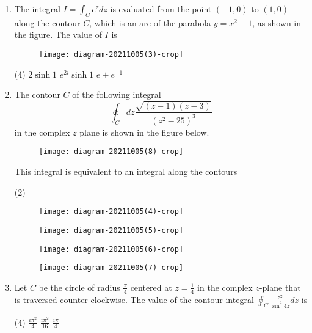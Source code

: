 \begin{enumerate}[label=\color{ocre}\textbf{\arabic*.}]
	\item The integral $I=\int_{C} e^{z} d z$ is evaluated from the point $(-1,0)$ to $(1,0)$ along the contour $C$, which is an arc of the parabola $y=x^{2}-1$, as shown in the figure. The value of $I$ is
	{}
	\begin{figure}[H]
		\centering
		\texttt{[image: diagram-20211005(3)-crop]}
	\end{figure}
	\begin{tasks}(4)
		\task[\textbf{B.}] $2 \sinh 1$
		\task[\textbf{C.}]  $e^{2 i} \sinh 1$
		\task[\textbf{D.}] $e+e^{-1}$
	\end{tasks}

	\item The contour $C$ of the following integral
	$$
	\oint_{C} d z \frac{\sqrt{(z-1)(z-3)}}{\left(z^{2}-25\right)^{3}}
	$$
	in the complex $z$ plane is shown in the figure below.\\
	\begin{figure}[H]
		\centering
		\texttt{[image: diagram-20211005(8)-crop]}
	\end{figure}
	This integral is equivalent to an integral along the contours
	{}
	\begin{tasks}(2)
		\task[\textbf{A.}] \begin{figure}[H]
			\centering
			\texttt{[image: diagram-20211005(4)-crop]}
		\end{figure}
		\task[\textbf{B.}] \begin{figure}[H]
			\centering
			\texttt{[image: diagram-20211005(5)-crop]}
		\end{figure}
		\task[\textbf{C.}] \begin{figure}[H]
			\centering
			\texttt{[image: diagram-20211005(6)-crop]}
		\end{figure}
		\task[\textbf{D.}] \begin{figure}[H]
			\centering
			\texttt{[image: diagram-20211005(7)-crop]}
		\end{figure}
	\end{tasks}

	\item  Let $C$ be the circle of radius $\frac{\pi}{4}$ centered at $z=\frac{1}{4}$ in the complex $z$-plane that is traversed counter-clockwise. The value of the contour integral $\oint_{C} \frac{z^{2}}{\sin ^{2} 4 z} d z$ is
	{}
	\begin{tasks}(4)
		\task[\textbf{B.}] $\frac{i \pi^{2}}{4}$
		\task[\textbf{C.}] $\frac{i \pi^{2}}{16}$
		\task[\textbf{D.}] $\frac{i \pi}{4}$
	\end{tasks}


\end{enumerate}
